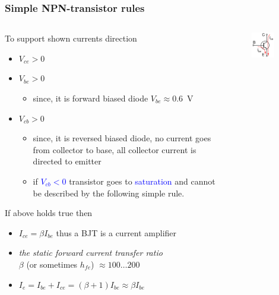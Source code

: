 \documentclass[beamer]{standalone}
\begin{document}
\begin{frame}
\frametitle{Simple NPN-transistor rules}
\begin{columns}[t]
 \begin{column}{.75\textwidth}
  To support shown currents direction
  \begin{itemize}
   \item \alert{$V_{ce} > 0$}
   \item \alert{$V_{be} > 0$}
    \begin{itemize}
     \item since, it is forward biased diode $V_{be} \approx 0.6$~V
    \end{itemize}
   \item \alert{$V_{cb} > 0$}
    \begin{itemize}
     \item since, it is reversed biased diode, no current goes from
      collector to base, all collector current is directed to emitter 
     \item if \textcolor{blue}{$V_{cb} < 0$} transistor goes to
      \textcolor{blue}{saturation} and cannot be
      described by the following simple rule.
    \end{itemize}
  \end{itemize}
  If above holds true then
  \begin{itemize}
   \item \alert{$I_{ce}=\beta I_{be}$} thus a BJT is a current
    amplifier
   \item {\it the static forward current transfer ratio}\\
    $\beta$ (or sometimes $h_{fe}$)   $\approx 100 \ldots 200$ 
   \item $I_e = I_{be} + I_{ce} = (\beta+1) I_{be} \approx \beta I_{be}$
  \end{itemize}
 \end{column}
 \begin{column}{.25\textwidth}
  \begin{figure}
   \includegraphics[width=0.80\textwidth]{./schematics/npn_transistor_with_currents.pdf}

\end{figure}
\end{column}
\end{columns}
\end{frame}
\end{document}
